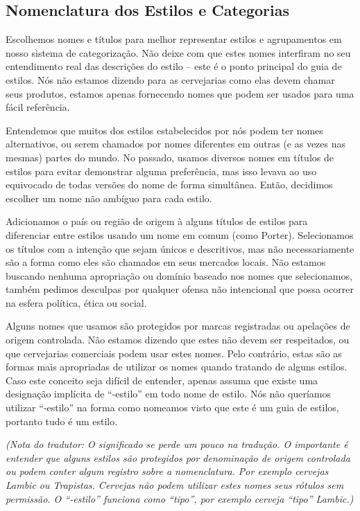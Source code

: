 \subsection*{Nomenclatura dos Estilos e Categorias}

Escolhemos nomes e títulos para melhor representar estilos e agrupamentos em nosso sistema de categorização.  Não deixe com que estes nomes interfiram no seu entendimento real das descrições do estilo – este é o ponto principal do guia de estilos. Nós não estamos dizendo para as cervejarias como elas devem chamar seus produtos, estamos apenas fornecendo nomes que podem ser usados para uma fácil referência.

Entendemos que muitos dos estilos estabelecidos por nós podem ter nomes alternativos, ou serem chamados por nomes diferentes em outras (e as vezes nas mesmas) partes do mundo. No passado, usamos diversos nomes em títulos de estilos para evitar demonstrar alguma preferência, mas isso levava ao uso equivocado de todas versões do nome de forma simultânea. Então, decidimos escolher um nome não ambíguo para cada estilo.

Adicionamos o país ou região de origem à alguns títulos de estilos para diferenciar entre estilos usando um nome em comum (como Porter). Selecionamos os títulos com a intenção que sejam únicos e descritivos, mas não necessariamente são a forma como eles são chamados em seus mercados locais. Não estamos buscando nenhuma apropriação ou domínio baseado nos nomes que selecionamos, também pedimos desculpas por qualquer ofensa não intencional que possa ocorrer na esfera política, ética ou social.

Alguns nomes que usamos são protegidos por marcas registradas ou apelações de origem controlada. Não estamos dizendo que estes não devem ser respeitados, ou que cervejarias comerciais podem usar estes nomes. Pelo contrário, estas são as formas mais apropriadas de utilizar os nomes quando tratando de alguns estilos. Caso este conceito seja difícil de entender, apenas assuma que existe uma designação implícita de “-estilo” em todo nome de estilo. Nós não queríamos utilizar “-estilo” na forma como nomeamos visto que este é um guia de estilos, portanto tudo é um estilo.

\textit{(Nota do tradutor: O significado se perde um pouco na tradução. O importante é entender que alguns estilos são protegidos por denominação de origem controlada ou podem conter algum registro sobre a nomenclatura. Por exemplo cervejas Lambic ou Trapistas. Cervejas não podem utilizar estes nomes seus rótulos sem permissão. O “-estilo” funciona como “tipo”, por exemplo cerveja “tipo” Lambic.)}